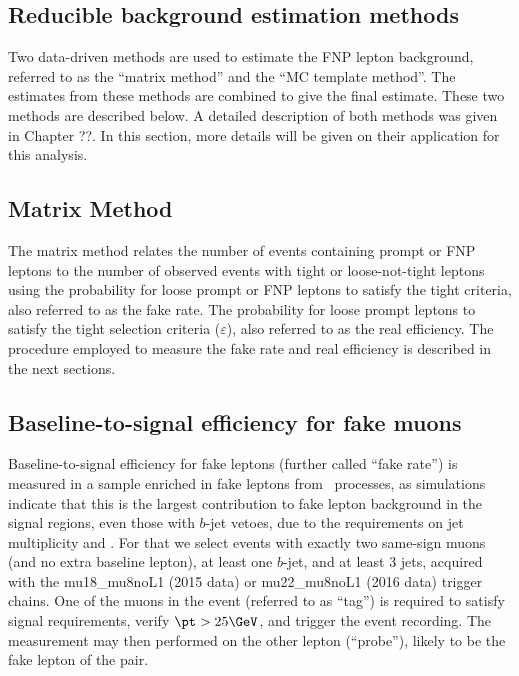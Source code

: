 \subsection{Reducible background estimation methods} 
\label{sec:DD_bkg}


Two data-driven methods are used to estimate the FNP lepton background, referred to as the ``matrix method'' and the ``MC template method''. 
The estimates from these methods are combined to give the final estimate. These two methods are described below. 
A detailed description of both methods was given in Chapter ??. 
In this section, more details will be given on their application for this 
analysis.



\subsection{Matrix Method}

The matrix method relates the number of events containing prompt or FNP leptons 
to the number of observed events with tight or loose-not-tight leptons 
using the probability for loose prompt or FNP leptons to satisfy the tight criteria, also referred to as the 
fake rate. 
The probability for loose prompt leptons to satisfy the tight selection 
criteria ($\varepsilon$), also referred to as the real efficiency.
The procedure employed to measure the fake rate and real efficiency is 
described in the next sections. 

\subsection{Baseline-to-signal efficiency for fake muons}
\label{subsubsec:fakes_matrix_fake_rate_muons}

Baseline-to-signal efficiency for fake leptons (further called ``fake rate'') is measured 
in a sample enriched in fake leptons from \ttbar\ processes, 
as simulations indicate that this is the largest contribution to fake lepton background in the signal regions, even those with $b$-jet vetoes, 
due to the requirements on jet multiplicity and \met. 
For that we select events with exactly two same-sign muons (and no extra baseline lepton), at least one $b$-jet, and at least 3 jets, 
acquired with the \textrm{mu18\_mu8noL1} (2015 data) or \textrm{mu22\_mu8noL1} (2016 data) trigger chains. 
One of the muons in the event (referred to as ``tag'') is required to satisfy signal requirements, verify $\pt>25 \GeV$, 
and trigger the event recording. 
The measurement may then performed on the other lepton (``probe''), likely to be the fake lepton of the pair. 

